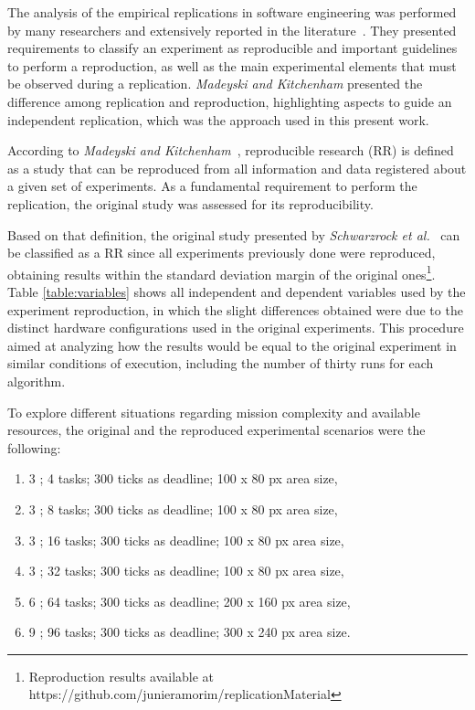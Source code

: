 The analysis of the empirical replications in software engineering was performed by many researchers and extensively reported in the literature~\cite{exp05, exp04, exp03, exp01}. They presented requirements to classify an experiment as reproducible and important guidelines to perform a reproduction, as well as the main experimental elements that must be observed during a replication. \textit{Madeyski and Kitchenham} \cite{exp02} presented the difference among replication and reproduction, highlighting aspects to guide an independent replication, which was the approach used in this present work.

According to \textit{Madeyski and Kitchenham}~\cite{exp02}, reproducible research (RR) is defined as a study that can be reproduced from all information and data registered about a given set of experiments. As a fundamental requirement to perform the replication, the original study was assessed for its reproducibility.

Based on that definition, the original study presented by \textit{Schwarzrock et al.}~\cite{MAS07} can be classified as a RR since all experiments previously done were reproduced, obtaining results within the standard deviation margin of the original ones\footnote{Reproduction results available at https://github.com/junieramorim/replicationMaterial}. Table \ref{table:variables} shows all independent and dependent variables used by the experiment reproduction, in which the slight differences obtained were due to the distinct hardware configurations used in the original experiments. This procedure aimed at analyzing how the results would be equal to the original experiment in similar conditions of execution, including the number of thirty runs for each algorithm.

To explore different situations regarding mission complexity and available resources, the original and the reproduced experimental scenarios were the following:

\begin{enumerate}
	\item 3 \uavs; 4 tasks; 300 ticks as deadline; 100 x 80 px area size, \label{case:4tasks}
	\item 3 \uavs; 8 tasks; 300 ticks as deadline; 100 x 80 px area size, \label{case:8tasks}
	\item 3 \uavs; 16 tasks; 300 ticks as deadline; 100 x 80 px area size, \label{case:16tasks}
	\item 3 \uavs; 32 tasks; 300 ticks as deadline; 100 x 80 px area size, \label{case:32tasks}
	\item 6 \uavs; 64 tasks; 300 ticks as deadline; 200 x 160 px area size, \label{case:64tasks}
	\item 9 \uavs; 96 tasks; 300 ticks as deadline; 300 x 240 px area size. \label{case:96tasks}
\end{enumerate}

